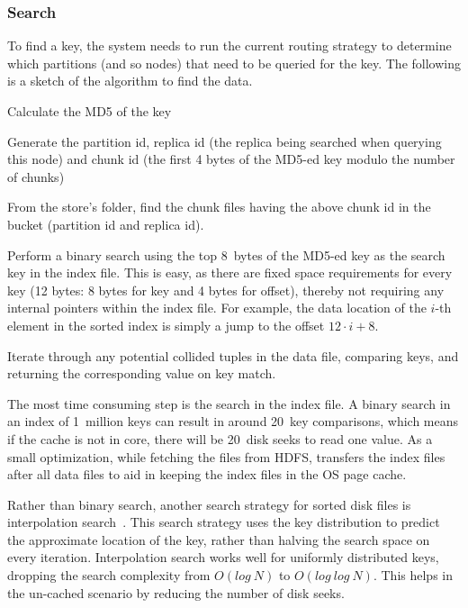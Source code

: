 
\subsubsection{Search}
\label{sec:read_only:search}

To find a key, the system needs to run the current routing strategy to
determine which partitions (and so nodes) that need to be queried for
the key. The following is a sketch of the algorithm to find the data. 

\begin{compactenum}
  \item Calculate the MD5 of the key
  \item Generate the partition id, replica id (the replica being
searched when querying this node) and chunk id (the first 4 bytes of
the MD5-ed key modulo the number of chunks)
  \item From the store's folder, find the chunk files having the above
chunk id in the bucket (partition id and replica id). 
  \item Perform a binary search using the top 8~bytes of the MD5-ed
key as the search key in the index file. This is easy, as there are
fixed space requirements for every key (12 bytes: 8 bytes for key and
4 bytes for offset), thereby not requiring any internal pointers
within the index file. For example, the data location of the $i$-th
element in the sorted index is simply a jump to
the offset $12 \cdot i + 8$.  
  \item Iterate through any potential collided tuples in the data
file, comparing keys, and returning the corresponding value on key
match. 
\end{compactenum}

The most time consuming step is the search in the index file. A binary
search in an index of 1~million keys can result in around 20~key
comparisons, which means if the cache is not in core, there will be
20~disk seeks to read one value. As a small optimization, while
fetching the files from HDFS, \projectname{} transfers the index files after
all data files to aid in keeping the index files in the OS page cache.

Rather than binary search, another search strategy for sorted disk
files is interpolation search~\cite{manolopoulos}. This search
strategy uses the key distribution to predict the approximate location
of the key, rather than halving the search space on every iteration.
Interpolation search works well for uniformly distributed keys,
dropping the search complexity from $O(log~N)$ to $O(log~log~N)$. This
helps in the un-cached scenario by reducing the number of disk seeks.

